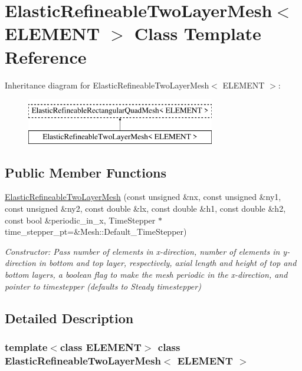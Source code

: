 \hypertarget{classElasticRefineableTwoLayerMesh}{}\section{Elastic\+Refineable\+Two\+Layer\+Mesh$<$ E\+L\+E\+M\+E\+NT $>$ Class Template Reference}
\label{classElasticRefineableTwoLayerMesh}
Inheritance diagram for Elastic\+Refineable\+Two\+Layer\+Mesh$<$ E\+L\+E\+M\+E\+NT $>$\+:\begin{figure}[H]
\begin{center}
\leavevmode
\includegraphics[height=2.000000cm]{classElasticRefineableTwoLayerMesh}
\end{center}
\end{figure}
\subsection*{Public Member Functions}
\begin{DoxyCompactItemize}
\item 
\hyperlink{classElasticRefineableTwoLayerMesh_a4f6c6b4214a7a99e94e24906d033f8f7}{Elastic\+Refineable\+Two\+Layer\+Mesh} (const unsigned \&nx, const unsigned \&ny1, const unsigned \&ny2, const double \&lx, const double \&h1, const double \&h2, const bool \&periodic\+\_\+in\+\_\+x, Time\+Stepper $\ast$time\+\_\+stepper\+\_\+pt=\&Mesh\+::\+Default\+\_\+\+Time\+Stepper)
\begin{DoxyCompactList}\small\item\em Constructor\+: Pass number of elements in x-\/direction, number of elements in y-\/direction in bottom and top layer, respectively, axial length and height of top and bottom layers, a boolean flag to make the mesh periodic in the x-\/direction, and pointer to timestepper (defaults to Steady timestepper) \end{DoxyCompactList}\end{DoxyCompactItemize}


\subsection{Detailed Description}
\subsubsection*{template$<$class E\+L\+E\+M\+E\+NT$>$\newline
class Elastic\+Refineable\+Two\+Layer\+Mesh$<$ E\+L\+E\+M\+E\+N\+T $>$}

